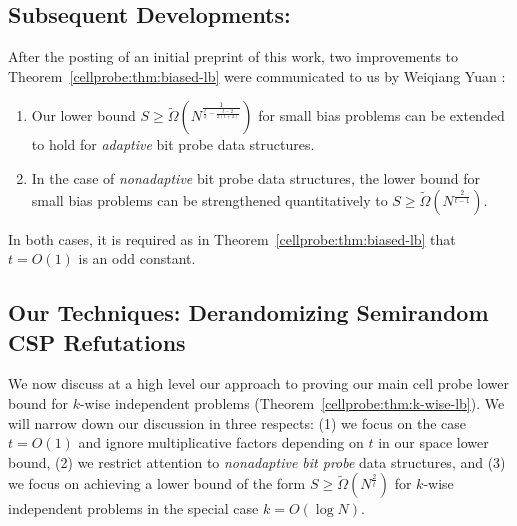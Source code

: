 \subsection{Subsequent Developments:}
After the posting of an initial preprint of this work, two improvements to Theorem~\ref{cellprobe:thm:biased-lb} were communicated to us by Weiqiang Yuan \cite{weiqiang}:
\begin{enumerate}
    \item Our lower bound $S \geq \tilde{\Omega}(N^{\frac{1}{\frac{t}{2} - \frac{t-2}{2(t+2)}}})$ for small bias problems can be extended to hold for \emph{adaptive} bit probe data structures.
    \item In the case of \emph{nonadaptive} bit probe data structures, the lower bound for small bias problems can be strengthened quantitatively to $S \geq \tilde{\Omega}(N^{\frac{2}{t-1}})$. 
\end{enumerate}
In both cases, it is required as in Theorem~\ref{cellprobe:thm:biased-lb} that $t=O(1)$ is an odd constant.

\subsection{Our Techniques: Derandomizing Semirandom CSP Refutations}\label{cellprobe:subsec:techniques}

We now discuss at a high level our approach to proving our main cell probe lower bound for $k$-wise independent problems (Theorem~\ref{cellprobe:thm:k-wise-lb}). We will narrow down our discussion in three respects: (1) we focus on the case $t= O(1)$ and ignore multiplicative factors depending on $t$ in our space lower bound, (2) we restrict attention to \emph{nonadaptive bit probe} data structures, and (3) we focus on achieving a lower bound of the form $S \geq \tilde{\Omega}(N^{\frac{2}{t}})$ for $k$-wise independent problems in the special case $k = O(\log N)$.

